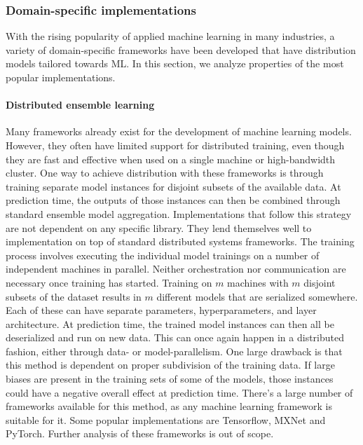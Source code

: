 \subsubsection{Domain-specific implementations}

With the rising popularity of applied machine learning in many industries, a variety of domain-specific frameworks have been developed that have distribution models tailored towards ML. In this section, we analyze properties of the most popular implementations.

\paragraph{Distributed ensemble learning}
Many frameworks already exist for the development of machine learning models. However, they often have limited support for distributed training, even though they are fast and effective when used on a single machine or high-bandwidth cluster. One way to achieve distribution with these frameworks is through training separate model instances for disjoint subsets of the available data. At prediction time, the outputs of those instances can then be combined through standard ensemble model aggregation\citep{Opitz1999}.
Implementations that follow this strategy are not dependent on any specific library. They lend themselves well to implementation on top of standard distributed systems frameworks. The training process involves executing the individual model trainings on a number of independent machines in parallel. Neither orchestration nor communication are necessary once training has started. Training on $m$ machines with $m$ disjoint subsets of the dataset results in $m$ different models that are serialized somewhere. Each of these can have separate parameters, hyperparameters, and layer architecture. At prediction time, the trained model instances can then all be deserialized and run on new data. This can once again happen in a distributed fashion, either through data- or model-parallelism.
One large drawback is that this method is dependent on proper subdivision of the training data. If large biases are present in the training sets of some of the models, those instances could have a negative overall effect at prediction time.
There's a large number of frameworks available for this method, as any machine learning framework is suitable for it. Some popular implementations are Tensorflow\citep{Tensorflow2015}, MXNet\citep{MXNet2017} and PyTorch\citep{PyTorch2017}. Further analysis of these frameworks is out of scope.

